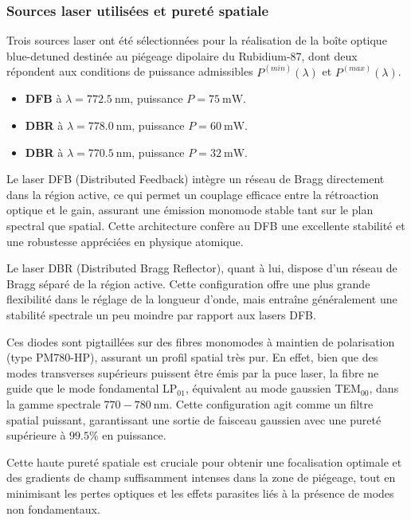 \subsubsection*{Sources laser utilisées et pureté spatiale}

Trois sources laser ont été sélectionnées pour la réalisation de la boîte optique blue-detuned destinée au piégeage dipolaire du Rubidium-87, dont deux répondent aux conditions de puissance admissibles $P^{(min)}(\lambda)$ et $P^{(max)}(\lambda)$.

\begin{itemize}
    \item \textbf{DFB} à $\lambda = 772.5~\text{nm}$, puissance $P = 75~\text{mW}$.
    \item \textbf{DBR} à $\lambda = 778.0~\text{nm}$, puissance $P = 60~\text{mW}$. 
    \item \textbf{DBR} à $\lambda = 770.5~\text{nm}$, puissance $P = 32~\text{mW}$.
\end{itemize}

\medskip

Le laser DFB (Distributed Feedback) intègre un réseau de Bragg directement dans la région active, ce qui permet un couplage efficace entre la rétroaction optique et le gain, assurant une émission monomode stable tant sur le plan spectral que spatial. Cette architecture confère au DFB une excellente stabilité et une robustesse appréciées en physique atomique.

Le laser DBR (Distributed Bragg Reflector), quant à lui, dispose d’un réseau de Bragg séparé de la région active. Cette configuration offre une plus grande flexibilité dans le réglage de la longueur d’onde, mais entraîne généralement une stabilité spectrale un peu moindre par rapport aux lasers DFB.

\medskip

Ces diodes sont pigtaillées sur des fibres monomodes à maintien de polarisation (type PM780-HP), assurant un profil spatial très pur. En effet, bien que des modes transverses supérieurs puissent être émis par la puce laser, la fibre ne guide que le mode fondamental LP$_{01}$, équivalent au mode gaussien TEM$_{00}$, dans la gamme spectrale $770{-}780~\text{nm}$. Cette configuration agit comme un filtre spatial puissant, garantissant une sortie de faisceau gaussien avec une pureté supérieure à $99.5\%$ en puissance.

\medskip

Cette haute pureté spatiale est cruciale pour obtenir une focalisation optimale et des gradients de champ suffisamment intenses dans la zone de piégeage, tout en minimisant les pertes optiques et les effets parasites liés à la présence de modes non fondamentaux.


